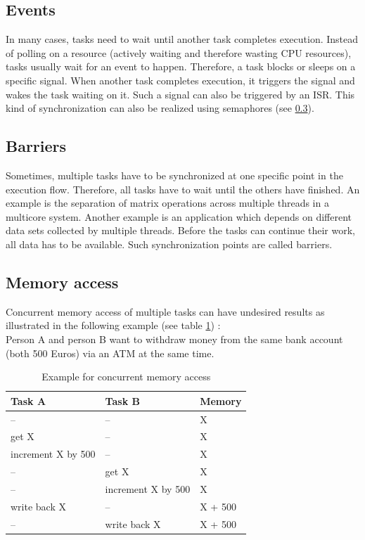 \subsection{Events}
In many cases, tasks need to wait until another task completes execution.
Instead of polling on a resource (actively waiting and therefore wasting \ac{CPU} resources), tasks usually wait for an event to happen.
Therefore, a task blocks or sleeps on a specific signal.
When another task completes execution, it triggers the signal and wakes the task waiting on it.
Such a signal can also be triggered by an \ac{ISR}.
This kind of synchronization can also be realized using semaphores (see \ref{ss_memory_access}).

\subsection{Barriers}\label{ss_barriers}
Sometimes, multiple tasks have to be synchronized at one specific point in the execution flow.
Therefore, all tasks have to wait until the others have finished.
An example is the separation of matrix operations across multiple threads in a multicore system. 
Another example is an application which depends on different data sets collected by multiple threads.
Before the tasks can continue their work, all data has to be available.
Such synchronization points are called barriers.

\subsection{Memory access}\label{ss_memory_access}
Concurrent memory access of multiple tasks can have undesired results as illustrated in the following example (see table \ref{tab_example_concurrent_memory_access}) :\\
Person A and person B want to withdraw money from the same bank account (both 500 Euros) via an ATM at the same time.

\begin{table}[htbp]
	\centering
		\begin{tabular}{|l|l|l|}
			\hline
				Task A 							& Task B 							& Memory  \\
				\hline 
				-- 									& -- 									& X 			\\
			  get X 							& -- 									& X				\\
			  increment X by 500 	& --									& X				\\
			  --									& get X								& X				\\
		 		--		 							& increment X by 500	& X				\\
			  write back X			 	& --									& X	+ 500	\\
			  --									& write back X				& X + 500	\\				   
			\hline
		\end{tabular}
	\caption{Example for concurrent memory access}
	\label{tab_example_concurrent_memory_access}
\end{table}


